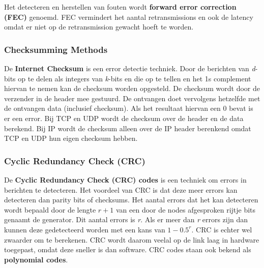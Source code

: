 Het detecteren en herstellen van fouten wordt \textbf{forward error correction (FEC)} genoemd.
FEC vermindert het aantal retransmissions en ook de latency omdat er niet op de retransmission gewacht hoeft te worden.

\subsubsection{Checksumming Methods}
De \textbf{Internet Checksum} is een error detectie techniek. Door de berichten van \textit{d}-bits op te delen als integers van \textit{k}-bits 
en die op te tellen en het 1s complement hiervan te nemen kan de checksum worden opgesteld. De checksum wordt door de verzender in de header mee gestuurd. 
De ontvangen doet vervolgens hetzelfde met de ontvangen data (inclusief checksum). Als het resultaat hiervan een 0 bevat is er een error.\newline
Bij TCP en UDP wordt de checksum  over de header en de data berekend. Bij IP wordt de checksum alleen over de IP header berenkend omdat TCP en UDP hun eigen checksum hebben.

\subsubsection{Cyclic Redundancy Check (CRC)}
De \textbf{Cyclic Redundancy Check (CRC) codes} is een techniek om errors in berichten te detecteren.
Het voordeel van CRC is dat deze meer errors kan detecteren dan parity bits of checksums. 
Het aantal errors dat het kan detecteren wordt bepaald door de lengte $\textit{r} + 1$ van een door de nodes afgesproken rijtje bits genaamt de generator. 
Dit aantal errors is \textit{r}. Als er meer dan \textit{r} errors zijn dan kunnen deze gedetecteerd worden met een kans van $1 - 0.5^\textit{r}$.
CRC is echter wel zwaarder om te berekenen.
CRC wordt daarom veelal op de link laag in hardware toegepast, omdat deze sneller is dan software.
CRC codes staan ook bekend als \textbf{polynomial codes}.  




